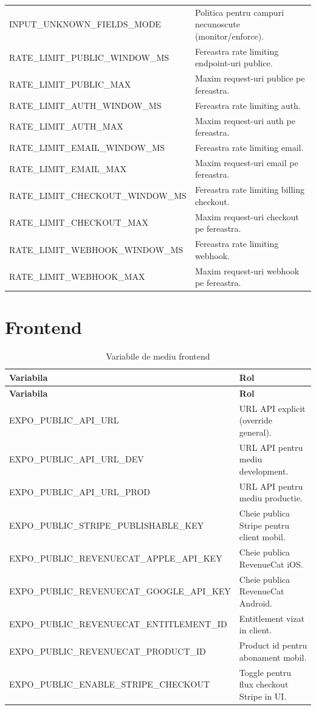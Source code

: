 \begin{longtable}{p{} p{}}
INPUT\_UNKNOWN\_FIELDS\_MODE & Politica pentru campuri necunoscute (monitor/enforce). \\
RATE\_LIMIT\_PUBLIC\_WINDOW\_MS & Fereastra rate limiting endpoint-uri publice. \\
RATE\_LIMIT\_PUBLIC\_MAX & Maxim request-uri publice pe fereastra. \\
RATE\_LIMIT\_AUTH\_WINDOW\_MS & Fereastra rate limiting auth. \\
RATE\_LIMIT\_AUTH\_MAX & Maxim request-uri auth pe fereastra. \\
RATE\_LIMIT\_EMAIL\_WINDOW\_MS & Fereastra rate limiting email. \\
RATE\_LIMIT\_EMAIL\_MAX & Maxim request-uri email pe fereastra. \\
RATE\_LIMIT\_CHECKOUT\_WINDOW\_MS & Fereastra rate limiting billing checkout. \\
RATE\_LIMIT\_CHECKOUT\_MAX & Maxim request-uri checkout pe fereastra. \\
RATE\_LIMIT\_WEBHOOK\_WINDOW\_MS & Fereastra rate limiting webhook. \\
RATE\_LIMIT\_WEBHOOK\_MAX & Maxim request-uri webhook pe fereastra. \\

\bottomrule
\end{longtable}

\section{Frontend}

\begin{longtable}{p{} p{}}
\caption{Variabile de mediu frontend} \\
\toprule
\textbf{Variabila} & \textbf{Rol} \\
\midrule
\endfirsthead
\toprule
\textbf{Variabila} & \textbf{Rol} \\
\midrule
\endhead

EXPO\_PUBLIC\_API\_URL & URL API explicit (override general). \\
EXPO\_PUBLIC\_API\_URL\_DEV & URL API pentru mediu development. \\
EXPO\_PUBLIC\_API\_URL\_PROD & URL API pentru mediu productie. \\

EXPO\_PUBLIC\_STRIPE\_PUBLISHABLE\_KEY & Cheie publica Stripe pentru client mobil. \\
EXPO\_PUBLIC\_REVENUECAT\_APPLE\_API\_KEY & Cheie publica RevenueCat iOS. \\
EXPO\_PUBLIC\_REVENUECAT\_GOOGLE\_API\_KEY & Cheie publica RevenueCat Android. \\
EXPO\_PUBLIC\_REVENUECAT\_ENTITLEMENT\_ID & Entitlement vizat in client. \\
EXPO\_PUBLIC\_REVENUECAT\_PRODUCT\_ID & Product id pentru abonament mobil. \\
EXPO\_PUBLIC\_ENABLE\_STRIPE\_CHECKOUT & Toggle pentru flux checkout Stripe in UI. \\

\bottomrule
\end{longtable}

